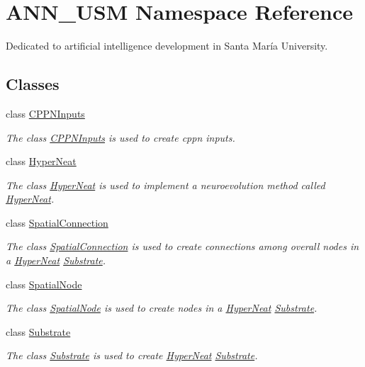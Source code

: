 \hypertarget{namespace_a_n_n___u_s_m}{\section{A\-N\-N\-\_\-\-U\-S\-M Namespace Reference}
\label{namespace_a_n_n___u_s_m}
}


Dedicated to artificial intelligence development in Santa María University.  


\subsection*{Classes}
\begin{DoxyCompactItemize}
\item 
class \hyperlink{class_a_n_n___u_s_m_1_1_c_p_p_n_inputs}{C\-P\-P\-N\-Inputs}
\begin{DoxyCompactList}\small\item\em The class \hyperlink{class_a_n_n___u_s_m_1_1_c_p_p_n_inputs}{C\-P\-P\-N\-Inputs} is used to create cppn inputs. \end{DoxyCompactList}\item 
class \hyperlink{class_a_n_n___u_s_m_1_1_hyper_neat}{Hyper\-Neat}
\begin{DoxyCompactList}\small\item\em The class \hyperlink{class_a_n_n___u_s_m_1_1_hyper_neat}{Hyper\-Neat} is used to implement a neuroevolution method called \hyperlink{class_a_n_n___u_s_m_1_1_hyper_neat}{Hyper\-Neat}. \end{DoxyCompactList}\item 
class \hyperlink{class_a_n_n___u_s_m_1_1_spatial_connection}{Spatial\-Connection}
\begin{DoxyCompactList}\small\item\em The class \hyperlink{class_a_n_n___u_s_m_1_1_spatial_connection}{Spatial\-Connection} is used to create connections among overall nodes in a \hyperlink{class_a_n_n___u_s_m_1_1_hyper_neat}{Hyper\-Neat} \hyperlink{class_a_n_n___u_s_m_1_1_substrate}{Substrate}. \end{DoxyCompactList}\item 
class \hyperlink{class_a_n_n___u_s_m_1_1_spatial_node}{Spatial\-Node}
\begin{DoxyCompactList}\small\item\em The class \hyperlink{class_a_n_n___u_s_m_1_1_spatial_node}{Spatial\-Node} is used to create nodes in a \hyperlink{class_a_n_n___u_s_m_1_1_hyper_neat}{Hyper\-Neat} \hyperlink{class_a_n_n___u_s_m_1_1_substrate}{Substrate}. \end{DoxyCompactList}\item 
class \hyperlink{class_a_n_n___u_s_m_1_1_substrate}{Substrate}
\begin{DoxyCompactList}\small\item\em The class \hyperlink{class_a_n_n___u_s_m_1_1_substrate}{Substrate} is used to create \hyperlink{class_a_n_n___u_s_m_1_1_hyper_neat}{Hyper\-Neat} \hyperlink{class_a_n_n___u_s_m_1_1_substrate}{Substrate}. \end{DoxyCompactList}\end{DoxyCompactItemize}
